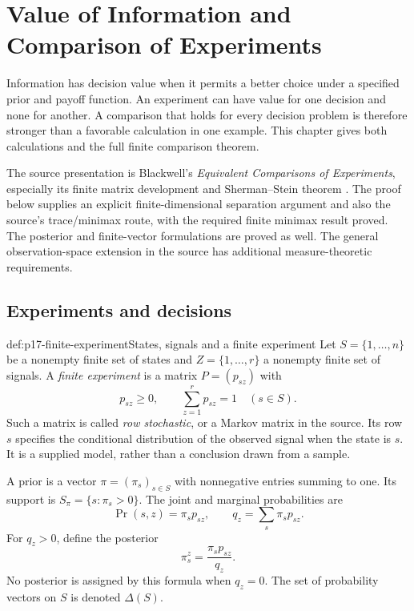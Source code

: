 \chapter{Value of Information and Comparison of Experiments}
\label{sec:p17-value-of-information}

Information has decision value when it permits a better choice under a
specified prior and payoff function. An experiment can have value for one
decision and none for another. A comparison that holds for every decision
problem is therefore stronger than a favorable calculation in one example.
This chapter gives both calculations and the full finite comparison theorem.

The source presentation is Blackwell's \emph{Equivalent Comparisons of
Experiments}, especially its finite matrix development and
Sherman--Stein theorem
\cite[pp.~265--268]{Blackwell1953EquivalentExperiments}.
The proof below supplies an explicit finite-dimensional separation argument
and also the source's trace/minimax route, with the required finite minimax
result proved. The posterior and finite-vector formulations are proved as
well. The general observation-space extension in the source has additional
measure-theoretic requirements.

\section{Experiments and decisions}
\label{sec:p17-experiment-decisions}

\begin{hbdefinition}{def:p17-finite-experiment}{States, signals and a finite experiment}
Let \(S=\{1,\ldots,n\}\) be a nonempty finite set of states and
\(Z=\{1,\ldots,r\}\) a nonempty finite set of signals.
A \emph{finite experiment} is a matrix \(P=(p_{sz})\) with
\[
 p_{sz}\geq0,\qquad \sum_{z=1}^r p_{sz}=1\quad(s\in S).
\]
Such a matrix is called \emph{row stochastic}, or a Markov matrix in
the source. Its row \(s\) specifies the conditional distribution of the
observed signal when the state is \(s\). It is a supplied model, rather
than a conclusion drawn from a sample.

A prior is a vector \(\pi=(\pi_s)_{s\in S}\) with nonnegative entries
summing to one. Its support is \(S_\pi=\{s:\pi_s>0\}\).
The joint and marginal probabilities are
\[
 \Pr(s,z)=\pi_s p_{sz},\qquad q_z=\sum_s\pi_s p_{sz}.
\]
For \(q_z>0\), define the posterior
\[
                  \pi^z_s=\frac{\pi_s p_{sz}}{q_z}.
\]
No posterior is assigned by this formula when \(q_z=0\).
The set of probability vectors on \(S\) is denoted \(\Delta(S)\).
\end{hbdefinition}

